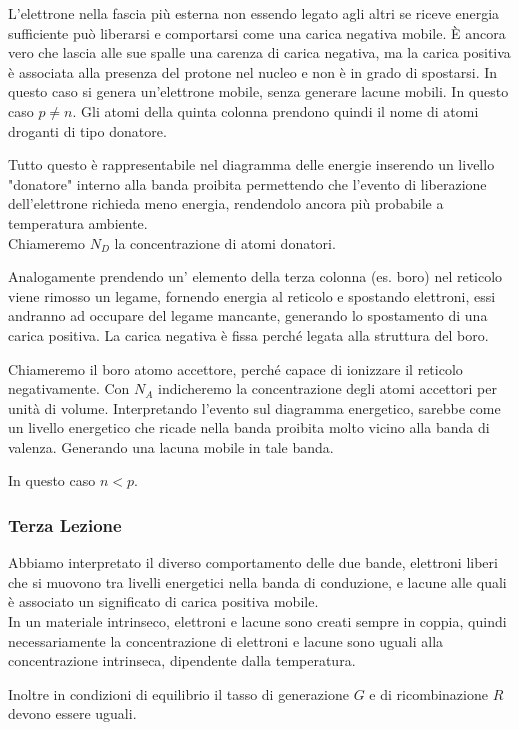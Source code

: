 \documentclass[../template]{subfiles}
\begin{document}
L'elettrone nella fascia più esterna non essendo legato agli altri se riceve energia sufficiente può liberarsi e comportarsi come una carica negativa mobile. È ancora vero che lascia alle sue spalle una carenza di carica negativa, ma la carica positiva è associata alla presenza del protone nel nucleo e non è in grado di spostarsi.
In questo caso si genera un'elettrone mobile, senza generare lacune mobili. In questo caso $p \neq n$. Gli atomi della quinta colonna prendono quindi il nome di atomi droganti di tipo donatore.

Tutto questo è rappresentabile nel diagramma delle energie inserendo un livello "donatore" interno alla banda proibita permettendo che l'evento di liberazione dell'elettrone richieda meno energia, rendendolo ancora più probabile a temperatura ambiente.
\\
Chiameremo $N_D$ la concentrazione di atomi donatori.

Analogamente prendendo un' elemento della terza colonna (es. boro) nel reticolo viene rimosso un legame, fornendo energia al reticolo e spostando elettroni, essi andranno ad occupare del legame mancante, generando lo spostamento di una carica positiva.
La carica negativa è fissa perché legata alla struttura del boro.

Chiameremo il boro atomo accettore, perché capace di ionizzare il reticolo negativamente. Con $N_A$ indicheremo la concentrazione degli atomi accettori per unità di volume. Interpretando l'evento sul diagramma energetico, sarebbe come un livello energetico che ricade nella banda proibita molto vicino alla banda di valenza. Generando una lacuna mobile in tale banda.

In questo caso $n < p$.

\subsubsection{Terza Lezione}
Abbiamo interpretato il diverso comportamento delle due bande, elettroni liberi che si muovono tra livelli energetici nella banda di conduzione, e lacune alle quali è associato un significato di carica positiva mobile.
\\
In un materiale intrinseco, elettroni e lacune sono creati sempre in coppia, quindi necessariamente la concentrazione di elettroni e lacune sono uguali alla concentrazione intrinseca, dipendente dalla temperatura.

Inoltre in condizioni di equilibrio il tasso di generazione $G$ e di ricombinazione $R$ devono essere uguali.
\end{document}
